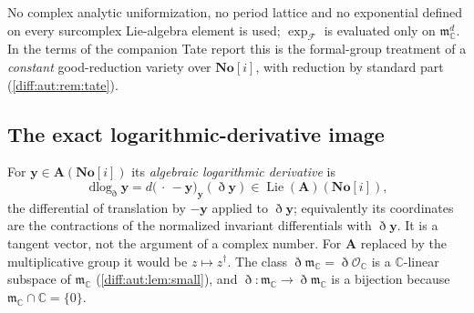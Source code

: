 \documentclass[11pt,letterpaper]{article}
\numberwithin{equation}{section}
\theoremstyle{definition}
\theoremstyle{remark}
\newcommand{\SC}{\mathbf{No}[i]}
\newcommand{\C}{\mathbb C}
\newcommand{\Ofin}{\mathcal O}
\newcommand{\mm}{\mathfrak m}
\newcommand{\Dn}{\eth}
\newcommand{\Lie}{\operatorname{Lie}}
\newcommand{\dlog}{\operatorname{dlog}}
\begin{document}
No complex analytic uniformization, no period lattice and no exponential defined
on every surcomplex Lie-algebra element is used; $\exp_{\mathcal F}$ is evaluated
only on $\mm_{\C}^{d}$. In the terms of the companion Tate report this is the
formal-group treatment of a \emph{constant} good-reduction variety over $\SC$,
with reduction by standard part (\cref{diff:aut:rem:tate}).

\subsection{The exact logarithmic-derivative image}
\label{diff:aut:sub:image}

For $\mathbf y\in\mathbf A(\SC)$ its \emph{algebraic logarithmic derivative} is
\begin{equation}\label{diff:aut:eq:dlog}
 \dlog_{\Dn}\mathbf y=d\bigl(\,\cdot\,-\mathbf y\bigr)_{\mathbf y}(\Dn\mathbf y)
 \in\Lie(\mathbf A)(\SC),
\end{equation}
the differential of translation by $-\mathbf y$ applied to $\Dn\mathbf y$;
equivalently its coordinates are the contractions of the normalized invariant
differentials with $\Dn\mathbf y$. It is a tangent vector, not the argument of a
complex number. For $\mathbf A$ replaced by the multiplicative group it would be
$z\mapsto z^{\dagger}$. The class $\Dn\mm_{\C}=\Dn\Ofin_{\C}$ is a $\C$-linear
subspace of $\mm_{\C}$ (\cref{diff:aut:lem:small}), and $\Dn:\mm_{\C}\to\Dn\mm_{\C}$
is a bijection because $\mm_{\C}\cap\C=\{0\}$.
\end{document}
